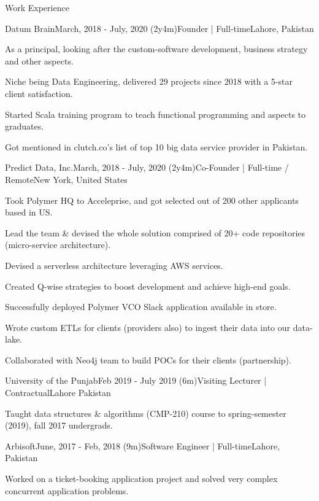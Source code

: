 \documentclass{resume}
\begin{document}
\begin{rSection}{Work Experience}
  \begin{rSubsection}{Datum Brain}{March, 2018 - July, 2020 (2y4m)}{Founder | Full-time}{Lahore, Pakistan}
    \item As a principal, looking after the custom-software development, business strategy and other aspects.
    \item Niche being Data Engineering, delivered 29 projects since 2018 with a 5-star client satisfaction.
    \item Started Scala training program to teach functional programming and aspects to graduates.
    \item Got mentioned in clutch.co's list of top 10 big data service provider in Pakistan.
  \end{rSubsection}
  \begin{rSubsection}{Predict Data, Inc.}{March, 2018 - July, 2020 (2y4m)}{Co-Founder | Full-time / Remote}{New York, United States}
    \item Took Polymer HQ to Acceleprise, and got selected out of 200 other applicants based in US.
    \item Lead the team \& devised the whole solution comprised of 20+ code repositories (micro-service architecture). 
    \item Devised a serverless architecture leveraging AWS services.
    \item Created Q-wise strategies to boost development and achieve high-end goals.
    \item Successfully deployed Polymer VCO Slack application available in store.
    \item Wrote custom ETLs for clients (providers also) to ingest their data into our data-lake.
    \item Collaborated with Neo4j team to build POCs for their clients (partnership).
  \end{rSubsection}
  \begin{rSubsection}{University of the Punjab}{Feb 2019 - July 2019 (6m)}{Visiting Lecturer | Contractual}{Lahore Pakistan}
    \item Taught data structures \& algorithms (CMP-210) course to spring-semester (2019), fall 2017 undergrads.
  \end{rSubsection}
  \begin{rSubsection}{Arbisoft}{June, 2017 - Feb, 2018 (9m)}{Software Engineer | Full-time}{Lahore, Pakistan}
    \item Worked on a ticket-booking application project and solved very complex concurrent application problems.

\end{rSubsection}
\end{rSection}
\end{document}
